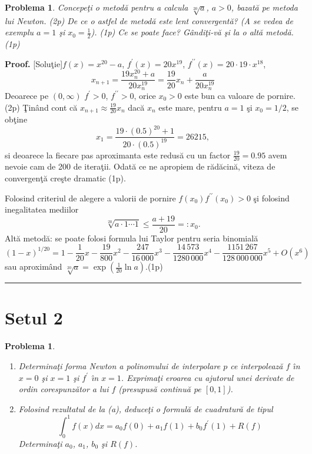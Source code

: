 \documentclass{article}%
\newtheorem{problem}[theorem]{Problema}
\newenvironment{proof}[1][Proof]{\noindent\textbf{#1.} }{\ \rule{0.5em}{0.5em}}
\begin{document}
\begin{problem}
\label{pb5.18} Concepe\c{t}i o metod\u{a} pentru a calcula $\sqrt[20]{a}$,
$a>0$, bazat\u{a} pe metoda lui Newton. (2p) De ce o astfel de metod\u{a} este
lent convergent\u{a}? (A se vedea de exemplu $a=1$ \c{s}i $x_{0}=\frac{1}{2}%
$). (1p) Ce se poate face? G\^{a}ndi\c{t}i-v\u{a} \c{s}i la o alt\u{a}
metod\u{a}. (1p)
\end{problem}

\begin{proof}
[Solu\c{t}ie]$f(x)=x^{20}-a$, $f^{\prime}(x)=20x^{19}$, $f^{\prime\prime
}(x)=20\cdot19\cdot x^{18}$,
\[
x_{n+1}=\frac{19x_{n}^{20}+a}{20x_{n}^{19}}=\frac{19}{20}x_{n}+\frac
{a}{20x_{n}^{19}}%
\]
Deoarece pe $(0,\infty)$ $f^{\prime}>0$, $f^{\prime\prime}>0$, orice $x_{0}>0$
este bun ca valoare de pornire. (2p) \c{T}in\^{a}nd cont c\u{a} $x_{n+1}%
\approx\frac{19}{20}x_{n}$ dac\u{a} $x_{n}$ este mare, pentru $a=1$ \c{s}i
$x_{0}=1/2$, se ob\c{t}ine
\[
x_{1}=\frac{19\cdot(0.5)^{20}+1}{20\cdot(0.5)^{19}}=26215,
\]
si deoarece la fiecare pas aproximanta este redus\u{a} cu un factor $\frac
{19}{20}=0.95$ avem nevoie cam de 200 de itera\c{t}ii. Odat\u{a} ce ne
apropiem de r\u{a}d\u{a}cin\u{a}, viteza de convergen\c{t}\u{a} cre\c{s}te
dramatic (1p).

Folosind criteriul de alegere a valorii de pornire $f(x_{0})f^{\prime\prime
}(x_{0})>0$ \c{s}i folosind inegalitatea mediilor%
\[
\sqrt[20]{a\cdot1\cdots1}\leq\frac{a+19}{20}=:x_{0}\text{.}%
\]
Alt\u{a} metod\u{a}: se poate folosi formula lui Taylor pentru seria
binomial\u{a}%
\[
(1-x)^{1/20}=\allowbreak1-\frac{1}{20}x-\frac{19}{800}x^{2}-\frac
{247}{16\,000}x^{3}-\frac{14\,573}{1280\,000}x^{4}-\allowbreak\frac
{1151\,267}{128\,000\,000}x^{5}+O\left(  x^{6}\right)
\]
sau aproxim\^{a}nd $\sqrt[20]{a}=\exp\left(  \frac{1}{20}\ln a\right)  $.(1p)
\end{proof}

\section*{Setul 2}

\begin{problem}
\label{pb4.17}

\begin{enumerate}
\item[(a)] Determina\c{t}i forma Newton a polinomului de interpolare $p$ ce
interpoleaz\u{a} $f$ \^{\i}n $x=0$ \c{s}i $x=1$ \c{s}i $f^{\prime}$ \^{\i}n
$x=1$. Exprima\c{t}i eroarea cu ajutorul unei derivate de ordin
corespunz\u{a}tor a lui $f$ (presupus\u{a} continu\u{a} pe $[0,1]$).

\item[(b)] Folosind rezultatul de la (a), deduce\c{t}i o formul\u{a} de
cuadratur\u{a} de tipul
\[
\int_{0}^{1}f(x)dx=a_{0}f(0)+a_{1}f(1)+b_{0}f^{\prime}(1)+R(f)
\]
Determina\c{t}i $a_{0}$, $a_{1}$, $b_{0}$ \c{s}i $R(f)$.
\end{enumerate}
\end{problem}
\end{document}
